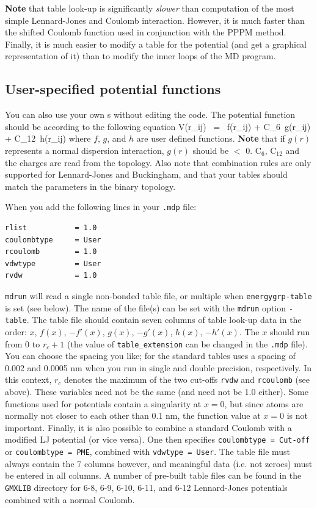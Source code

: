 {\bf Note} that table look-up is significantly {\em
slower} than computation of the most simple Lennard-Jones and Coulomb
interaction. However, it is much faster than the shifted Coulomb
function used in conjunction with the PPPM method. Finally, it is much
easier to modify a table for the potential (and get a graphical
representation of it) than to modify the inner loops of the MD
program.

\subsection{User-specified potential functions}
\label{subsec:userpot}
You can also use your own s 
without editing the {\gromacs} code. 
The potential function should be according to the following equation
\beq
V(r_{ij}) ~=~  f(r_{ij}) + C_6 \,g(r_{ij}) + C_{12} \,h(r_{ij})
\eeq
where $f$, $g$, and $h$ are user defined functions. {\bf Note} that if $g(r)$ represents a
normal dispersion interaction, $g(r)$ should be $<$ 0. C$_6$, C$_{12}$
and the charges are read from the topology. Also note that combination
rules are only supported for Lennard-Jones and Buckingham, and that
your tables should match the parameters in the binary topology.

When you add the following lines in your {\tt .mdp} file:

{\small
\begin{verbatim}
rlist           = 1.0
coulombtype     = User
rcoulomb        = 1.0
vdwtype         = User
rvdw            = 1.0
\end{verbatim}}

{\tt mdrun} will read a single non-bonded table file,
or multiple when {\tt energygrp-table} is set (see below).
The name of the file(s) can be set with the {\tt mdrun} option {\tt -table}.
The table file should contain seven columns of table look-up data in the
order: $x$, $f(x)$, $-f'(x)$, $g(x)$, $-g'(x)$, $h(x)$, $-h'(x)$.
The $x$ should run from 0 to $r_c+1$ (the value of {\tt table_extension} can be
changed in the {\tt .mdp} file).
You can choose the spacing you like; for the standard tables {\gromacs}
uses a spacing of 0.002 and 0.0005 nm when you run in single
and double precision, respectively.  In this
context, $r_c$ denotes the maximum of the two cut-offs {\tt rvdw} and
{\tt rcoulomb} (see above). These variables need not be the same (and
need not be 1.0 either).  Some functions used for potentials contain a
singularity at $x = 0$, but since atoms are normally not closer to each
other than 0.1 nm, the function value at $x = 0$ is not important.
Finally, it is also
possible to combine a standard Coulomb with a modified LJ potential
(or vice versa). One then specifies {\eg} {\tt coulombtype = Cut-off} or
{\tt coulombtype = PME}, combined with {\tt vdwtype = User}.  The table file must
always contain the 7 columns however, and meaningful data (i.e. not
zeroes) must be entered in all columns.  A number of pre-built table
files can be found in the {\tt GMXLIB} directory for 6-8, 6-9, 6-10, 6-11, and 6-12
Lennard-Jones potentials combined with a normal Coulomb.

